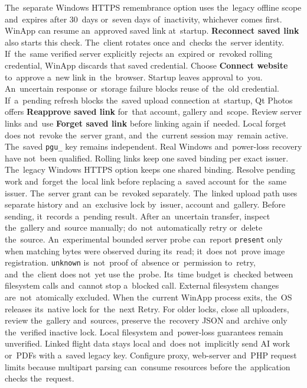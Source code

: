 \documentclass[11pt,a4paper]{article}
\newcommand{\ui}[1]{\textbf{#1}}
\begin{document}
The~separate Windows HTTPS remembrance option uses the~legacy offline scope
and~expires after 30~days or~seven days of~inactivity, whichever comes first.
WinApp can resume an~approved saved link at~startup.
\ui{Reconnect saved link} also starts this check. The~client rotates once
and~checks the~server identity. If~the~same verified server explicitly rejects
an~expired or~revoked rolling credential, WinApp discards that saved credential.
Choose \ui{Connect website} to~approve a~new link in~the~browser. Startup leaves
approval to~you. An~uncertain
response or~storage failure blocks reuse of~the~old credential. If~a~pending
refresh blocks the~saved upload connection at~startup, Qt Photos offers
\ui{Reapprove saved link} for~that account, gallery and~scope. Review server
links and~use \ui{Forget saved link} before linking again if~needed. Local forget
does not~revoke the~server grant, and~the~current session may~remain active.
The~saved \texttt{pgu\_} key remains independent. Real Windows and~power-loss
recovery have not~been qualified. Rolling links keep one saved binding per exact
issuer. The~legacy Windows
HTTPS option keeps one shared binding. Resolve pending work and~forget
the~local link before replacing a~saved account for~the~same issuer.
The~server grant can be~revoked separately. The~linked upload
path uses separate history and~an~exclusive lock by~issuer, account
and~gallery. Before sending, it~records a~pending result. After an~uncertain
transfer, inspect the~gallery and~source manually; do~not~automatically retry
or~delete the~source. An~experimental bounded server probe can~report
\texttt{present} only when matching bytes were observed during its~read;
it~does not~prove image registration. \texttt{unknown} is~not~proof of~absence
or~permission to~retry, and~the~client does not~yet use the~probe. Its~time
budget is~checked between filesystem calls and~cannot stop a~blocked call.
External filesystem changes are~not~atomically excluded. When the~current
WinApp process exits, the~OS releases its~native lock for~the~next Retry.
For older locks, close all uploaders, review the~gallery and~sources, preserve
the~recovery JSON and~archive only the~verified inactive lock. Local
filesystem and~power-loss guarantees remain unverified. Linked flight data stays
local and~does not~implicitly send AI work or~PDFs with a~saved legacy key.
Configure proxy, web-server and~PHP request limits because multipart parsing
can~consume resources before the~application checks the~request.
\end{document}

